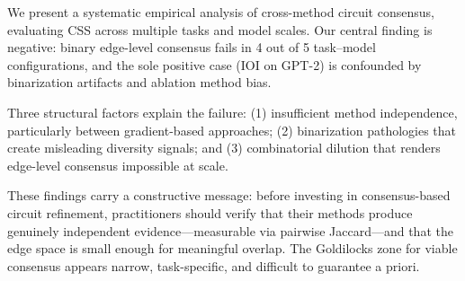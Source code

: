 \documentclass[11pt,a4paper]{article}
\newcommand{\css}{\textsc{CSS}}
\begin{document}
We present a systematic empirical analysis of cross-method circuit consensus, evaluating \css{} across multiple tasks and model scales.
Our central finding is negative: binary edge-level consensus fails in 4 out of 5 task--model configurations, and the sole positive case (IOI on GPT-2) is confounded by binarization artifacts and ablation method bias.

Three structural factors explain the failure: (1) insufficient method independence, particularly between gradient-based approaches; (2) binarization pathologies that create misleading diversity signals; and (3) combinatorial dilution that renders edge-level consensus impossible at scale.

These findings carry a constructive message: before investing in consensus-based circuit refinement, practitioners should verify that their methods produce genuinely independent evidence---measurable via pairwise Jaccard---and that the edge space is small enough for meaningful overlap.
The Goldilocks zone for viable consensus appears narrow, task-specific, and difficult to guarantee a priori.



\end{document}
